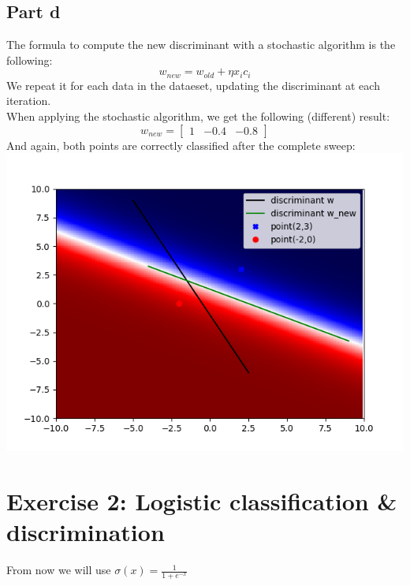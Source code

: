 \documentclass[a4paper, 10pt]{article}
\begin{document}
\subsection{Part d} 
The formula to compute the new discriminant with a stochastic algorithm is the following:
$$
w_{new} = w_{old}+\eta x_i c_i
$$
We repeat it for each data in the dataeset, updating the discriminant at each iteration.
\\
When applying the stochastic algorithm, we get the following (different) result: 
$$ 
w_{new} = \begin{bmatrix}1 & -0.4 & -0.8\end{bmatrix} 
$$ 
And again, both points are correctly classified after the complete sweep: 
\\ 
\includegraphics[scale=0.6]{ex1_d.png} 

\section{Exercise 2: Logistic classification \& discrimination}
From now we will use $\sigma(x)=\frac{1}{1+e^{-x}}$
\end{document}
